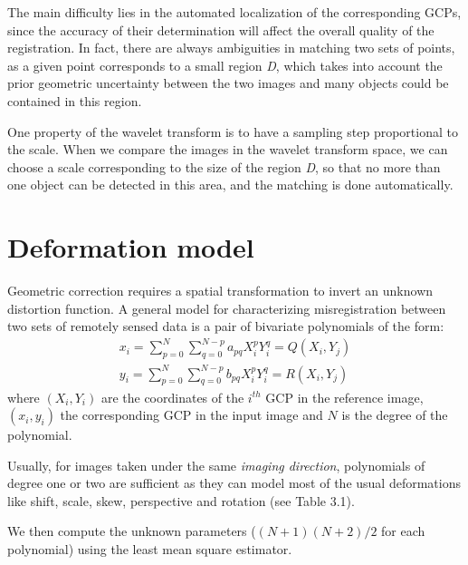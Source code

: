 \bigskip
The main difficulty lies in the automated localization of the corresponding 
GCPs, since the accuracy of their determination will affect the overall 
quality of the registration.  In fact, there are always ambiguities in 
matching two sets of points, as a given point corresponds to a small region 
{\em D}, which takes into account the prior geometric uncertainty between 
the two images and many objects could be contained in this region.
\bigskip

 One property of the wavelet transform is to have a sampling step proportional 
to the scale.  When we compare the images in the wavelet transform space, 
we can choose a scale corresponding to the size of the region {\em D}, so 
that no more than one object can be detected in this area, and the matching 
is done automatically.

\section{Deformation model}%
Geometric correction requires a spatial transformation to invert an unknown 
distortion function.  A general model for characterizing misregistration 
between two sets of remotely sensed data is a pair of bivariate polynomials 
of the form:
\begin{eqnarray*}
x_i = \displaystyle{ \sum^{N}_{p=0} \sum^{N-p}_{q=0} a_{pq} 
X^{p}_{i} Y^{q}_{i} = Q(X_{i}, Y_{j}) } \\
y_i = \displaystyle{ \sum^{N}_{p=0} \sum^{N-p}_{q=0} b_{pq} 
X^{p}_{i} Y^{q}_{i} = R(X_{i}, Y_{j}) }
\end{eqnarray*}
where $(X_{i},Y_{i})$ are the coordinates of the $i^{th}$ GCP in the 
reference image, $(x_{i},y_{i})$ the corresponding GCP in the input 
image and $N$ is the degree of the polynomial.

Usually, for images taken 
under the same {\em imaging direction}, polynomials of degree one or two 
are sufficient as they can model most of the usual deformations like shift, 
scale, skew, perspective and rotation (see Table 3.1). 

We then compute the unknown parameters 
($(N+1)(N+2)/2$ for each polynomial) using the least mean square 
estimator. \\ 

